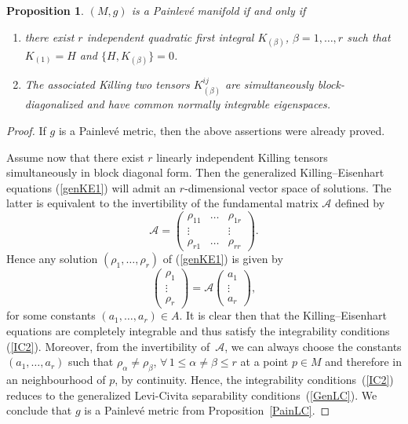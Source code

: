 \documentclass[11pt]{article}
\numberwithin{equation}{section}
\newtheorem{Proposition}[Theorem]{Proposition}
 { \theoremstyle{definition}
\newtheorem{Definition}[Theorem]{Definition}
\newtheorem{Example}[Theorem]{Example}
\newtheorem{Remark}[Theorem]{Remark} }
\begin{document}
\begin{Proposition} \label{PainKA}
$(M,g)$ is a Painlev\'e manifold if and only if
\begin{enumerate}\itemsep=0pt
\item[$1)$] there exist $r$ independent quadratic first integral $K_{(\beta)}$, $\beta = 1,\dots,r$ such that $K_{(1)} = H$ and $\{ H, K_{(\beta)} \} = 0$.
\item[$2)$] The associated Killing two tensors	$K_{(\beta)}^{ij}$ are simultaneously block-diagonalized and have common normally integrable eigenspaces.
\end{enumerate}
\end{Proposition}
\begin{proof}
If $g$ is a Painlev\'e metric, then the above assertions were already proved.

Assume now that there exist $r$ linearly independent Killing tensors simultaneously in block diagonal form. Then the generalized Killing--Eisenhart equations (\ref{genKE1}) will admit an $r$-dimen\-sio\-nal vector space of solutions. The latter is equivalent to the invertibility of the fundamental matrix $\mathcal{A}$ defined by
\[
{\mathcal{A}}=\left(
\begin{matrix}
\rho_{11}&\dots&\rho_{1r} \\
\vdots& & \vdots \\
\rho_{r1}&\dots&\rho_{rr}
\end{matrix}
\right).
\]
Hence any solution $(\rho_{1},\dots,\rho_{r})$ of (\ref{genKE1}) is given by
\[
\left(
\begin{matrix}\rho_{1}\\
\vdots\\
\rho_{r}
\end{matrix}
\right)
=
{\mathcal{A}}\left(
\begin{matrix}a_{1}\\
\vdots\\
a_{r}
\end{matrix}
\right),
\]
for some constants $(a_{1},\dots,a_{r})\in A$. It is clear then that the Killing--Eisenhart equations are completely integrable and thus satisfy the integrability conditions (\ref{IC2}). Moreover, from the invertibility of~$\mathcal{A}$, we can always choose the constants $(a_1,\dots,a_r)$ such that $\rho_{\alpha} \neq \rho_{\beta}$, $\forall\, 1 \leq \alpha \ne \beta \leq r$ at a point $p\in M$ and therefore in an neighbourhood of $p$, by continuity. Hence, the integrabi\-li\-ty conditions~(\ref{IC2}) reduces to the generalized Levi-Civita separability conditions~(\ref{GenLC}). We conclude that $g$ is a Painlev\'e metric from Proposition~\ref{PainLC}.
\end{proof}
\end{document}
